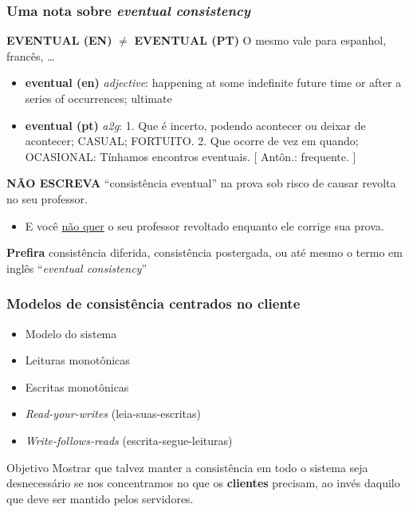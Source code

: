 \documentclass[Ligatures=TeX,table,brazil,svgnames,usetotalslideindicator,compress,10pt]{beamer}
\begin{document}
\begin{frame}
  \frametitle{Uma nota sobre \emph{eventual consistency}}
  \begin{block}{\alert{\textbf{EVENTUAL (EN)} $\neq$ \textbf{EVENTUAL (PT)}}}
      O mesmo vale para espanhol, francês, \ldots
    \begin{itemize}
    \item \textbf{eventual (en)} \emph{adjective}: happening at some
      indefinite future time or after a series of occurrences; ultimate

    \item \textbf{eventual (pt)} \emph{a2g}: 1. Que é incerto, podendo
      acontecer ou deixar de acontecer; CASUAL; FORTUITO. 2. Que ocorre
      de vez em quando; OCASIONAL: Tínhamos encontros eventuais. [
      Antôn.: frequente. ]
    \end{itemize}
  \end{block}

  \textbf{\alert{NÃO ESCREVA}} ``consistência eventual'' na prova sob
  risco de causar revolta no seu professor.
  \begin{itemize}
  \item E você \underline{não quer} o seu professor revoltado enquanto ele corrige sua prova.~\faSmileO
  \end{itemize}
  \textbf{Prefira} consistência diferida, consistência postergada, ou até mesmo o termo em inglês ``\emph{eventual consistency}''

\end{frame}


\begin{frame}
  \frametitle{Modelos de consistência centrados no cliente}
  \begin{itemize}
  \item Modelo do sistema
  \item Leituras monotônicas
  \item Escritas monotônicas
  \item \textit{Read-your-writes} (leia-suas-escritas)
  \item \textit{Write-follows-reads} (escrita-segue-leituras)
  \end{itemize}

  \begin{block}{Objetivo}
    Mostrar que talvez manter a consistência em todo o sistema seja
    desnecessário se nos concentramos no que os \textbf{clientes}
    precisam, ao invés daquilo que deve ser mantido pelos servidores.
  \end{block}
\end{frame}
\end{document}
